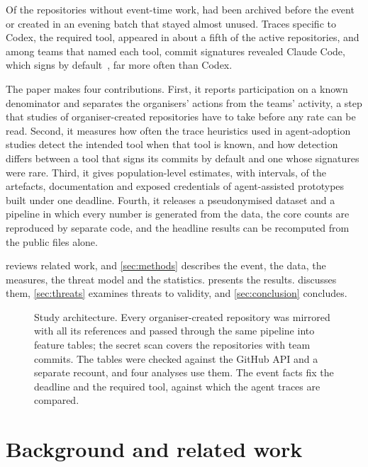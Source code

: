 \documentclass{article}
\begin{document}
Of the \NRqOneInactiveN{} repositories without event-time work, \NRqOneInactiveOrganiserN{} had been archived before the event or created in an evening batch that stayed almost unused. Traces specific to Codex, the required tool, appeared in about a fifth of the active repositories, and among teams that named each tool, commit signatures revealed Claude Code, which signs by default~\cite{claudecode2026attribution}, far more often than Codex.

The paper makes four contributions. First, it reports participation on a known denominator and separates the organisers' actions from the teams' activity, a step that studies of organiser-created repositories have to take before any rate can be read. Second, it measures how often the trace heuristics used in agent-adoption studies detect the intended tool when that tool is known, and how detection differs between a tool that signs its commits by default and one whose signatures were rare. Third, it gives population-level estimates, with intervals, of the artefacts, documentation and exposed credentials of agent-assisted prototypes built under one deadline. Fourth, it releases a pseudonymised dataset and a pipeline in which every number is generated from the data, the core counts are reproduced by separate code, and the headline results can be recomputed from the public files alone.

 reviews related work, and \cref{sec:methods} describes the event, the data, the measures, the threat model and the statistics.  presents the results.  discusses them, \cref{sec:threats} examines threats to validity, and \cref{sec:conclusion} concludes.

\begin{figure}[t]
  \centering
  
  \caption{Study architecture. Every organiser-created repository was mirrored with all its references and passed through the same pipeline into feature tables; the secret scan covers the repositories with team commits. The tables were checked against the GitHub API and a separate recount, and four analyses use them. The event facts fix the deadline and the required tool, against which the agent traces are compared.}
  \label{fig:overview}
\end{figure}

\section{Background and related work}\label{sec:related}
\end{document}
